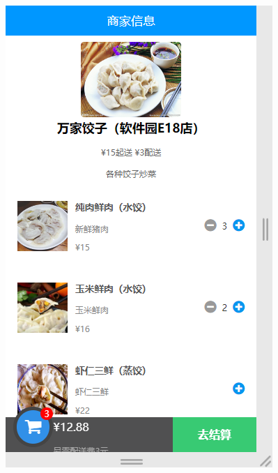 \begin{figure}[H]
{\begin{minipage}[t]{0.22\linewidth}
            \includegraphics[scale=0.3]{figures/2.2.3.png}\\

\end{minipage}}
\end{figure}

